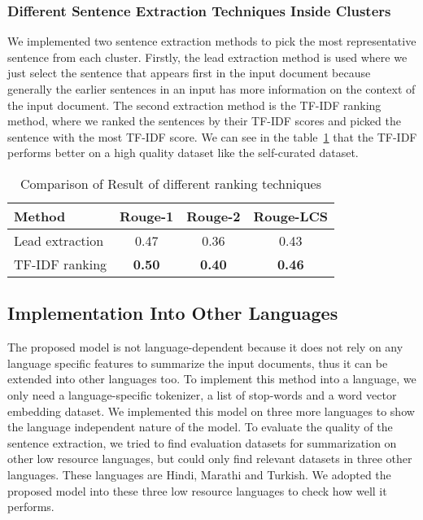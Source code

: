 \subsubsection{Different Sentence Extraction Techniques Inside Clusters} \label{subsubsec:different-ranking-techniques-inside-clusters}
We implemented two sentence extraction methods to pick the most representative sentence from each cluster. Firstly, the lead extraction method is used where we just select the sentence that appears first in the input document because generally the earlier sentences in an input has more information on the context of the input document. The second extraction method is the TF-IDF ranking method, where we ranked the sentences by their TF-IDF scores and picked the sentence with the most TF-IDF score. We can see in the table~\ref{tab:ranking} that the TF-IDF performs better on a high quality dataset like the self-curated dataset.

\begin{table}[]
    \centering
    \begin{tabular}{lccc}\hline
        Method      	& Rouge-1       & Rouge-2       & Rouge-LCS     \\\hline
        Lead extraction	& 0.47          & 0.36          & 0.43          \\
        TF-IDF ranking	& \textbf{0.50} & \textbf{0.40} & \textbf{0.46} \\\hline
    \end{tabular}
    \caption{Comparison of Result of different ranking techniques}
    \label{tab:ranking}
\end{table}

\subsection{Implementation Into Other Languages}\label{subsec:implementation-into-other-languages}
The proposed model is not language-dependent because it does not rely on any language specific features to summarize the input documents, thus it can be extended into other languages too. To implement this method into a language, we only need a language-specific tokenizer, a list of stop-words and a word vector embedding dataset. We implemented this model on three more languages to show the language independent nature of the model. To evaluate the quality of the sentence extraction, we tried to find evaluation datasets for summarization on other low resource languages, but could only find relevant datasets in three other languages. These languages are Hindi, Marathi and Turkish. We adopted the proposed model into these three low resource languages to check how well it performs.\\

